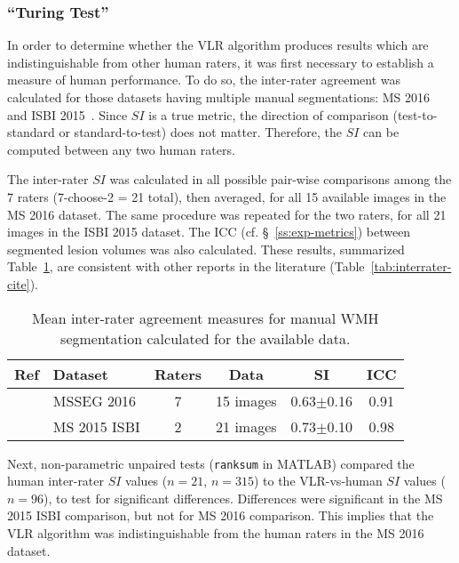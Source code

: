\subsubsection{``Turing Test''}
In order to determine whether the VLR algorithm produces results which are indistinguishable
from other human raters, it was first necessary to establish a measure of human performance.
To do so, the inter-rater agreement was calculated for those datasets
having multiple manual segmentations: MS 2016~\cite{MSSEG2016} and ISBI 2015~\cite{MSISBI2015}.
Since $SI$ is a true metric,
the direction of comparison (test-to-standard or standard-to-test) does not matter.
Therefore, the $SI$ can be computed between any two human raters.
\par
The inter-rater $SI$ was calculated in all possible pair-wise comparisons among the 7 raters
(7-choose-2 = 21 total), then averaged, for all 15 available images in the MS 2016 dataset.
The same procedure was repeated for the two raters, for all 21 images in the ISBI 2015 dataset.
The ICC (cf. \S~\ref{ss:exp-metrics}) between segmented lesion volumes was also calculated.
These results, summarized Table~\ref{tab:interrater-inhouse},
are consistent with other reports in the literature (Table~\ref{tab:interrater-cite}).
\par
\begin{table}
  \centering
  \caption{Mean inter-rater agreement measures
    for manual WMH segmentation calculated for the available data.}%
  \label{tab:interrater-inhouse}
  \begin{tabular}{clcccc}
    \toprule
    Ref & Dataset & Raters & Data & SI & ICC \\
    \midrule
    \cite{MSSEG2016}  & MSSEG 2016   &  7  & 15 images & 0.63$\pm$0.16 & 0.91 \\ %
    \cite{MSISBI2015} & MS 2015 ISBI &  2  & 21 images & 0.73$\pm$0.10 & 0.98 \\ %
    \bottomrule
  \end{tabular}
\end{table}
Next, non-parametric unpaired tests (\texttt{ranksum} in MATLAB) compared
the human inter-rater $SI$ values ($n=21$, $n=315$)
to the VLR-vs-human $SI$ values ($n=96$),
to test for significant differences.
Differences were significant in the MS 2015 ISBI comparison,
but not for MS 2016 comparison.
This implies that the VLR algorithm was indistinguishable from the human raters
in the MS 2016 dataset.
